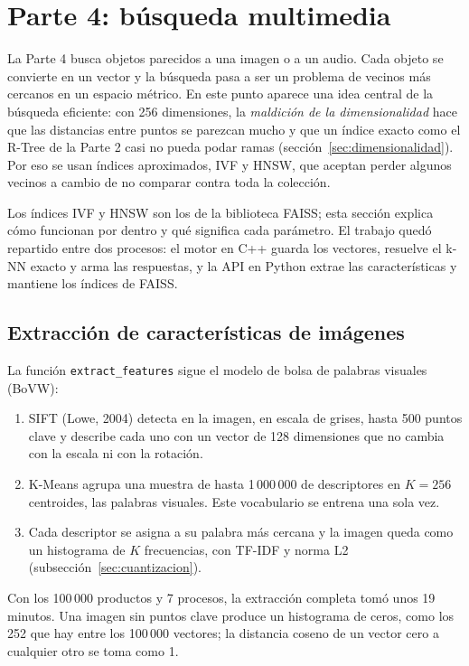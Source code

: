 \documentclass[11pt,a4paper]{article}
\begin{document}
\section{Parte 4: búsqueda multimedia}
\label{sec:parte4}

La Parte 4 busca objetos parecidos a una imagen o a un audio. Cada objeto se convierte en un vector y la búsqueda pasa a ser un problema de vecinos más cercanos en un espacio métrico. En este punto aparece una idea central de la búsqueda eficiente: con 256 dimensiones, la \emph{maldición de la dimensionalidad} hace que las distancias entre puntos se parezcan mucho y que un índice exacto como el R-Tree de la Parte 2 casi no pueda podar ramas (sección~\ref{sec:dimensionalidad}). Por eso se usan índices aproximados, IVF y HNSW, que aceptan perder algunos vecinos a cambio de no comparar contra toda la colección.

Los índices IVF y HNSW son los de la biblioteca FAISS; esta sección explica cómo funcionan por dentro y qué significa cada parámetro. El trabajo quedó repartido entre dos procesos: el motor en C++ guarda los vectores, resuelve el k-NN exacto y arma las respuestas, y la API en Python extrae las características y mantiene los índices de FAISS.

\subsection{Extracción de características de imágenes}

La función \texttt{extract\_features} sigue el modelo de bolsa de palabras visuales (BoVW):

\begin{enumerate}
  \item SIFT (Lowe, 2004) detecta en la imagen, en escala de grises, hasta 500 puntos clave y describe cada uno con un vector de 128 dimensiones que no cambia con la escala ni con la rotación.
  \item K-Means agrupa una muestra de hasta 1\,000\,000 de descriptores en $K = 256$ centroides, las palabras visuales. Este vocabulario se entrena una sola vez.
  \item Cada descriptor se asigna a su palabra más cercana y la imagen queda como un histograma de $K$ frecuencias, con TF-IDF y norma L2 (subsección~\ref{sec:cuantizacion}).
\end{enumerate}

Con los 100\,000 productos y 7 procesos, la extracción completa tomó unos 19 minutos. Una imagen sin puntos clave produce un histograma de ceros, como los 252 que hay entre los 100\,000 vectores; la distancia coseno de un vector cero a cualquier otro se toma como 1.
\end{document}
